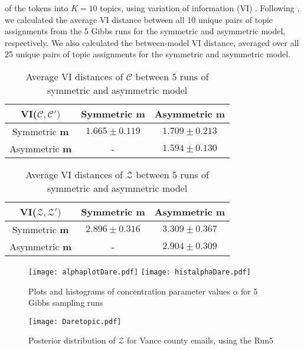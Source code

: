 \documentclass[a4paper]{article}
\begin{document}
of the tokens into $K=10$ topics, using variation
of information (VI) \citep{meilua2003comparing}. Following \cite{wallach2009rethinking}, we calculated
the average VI distance between all 10 unique pairs of topic assignments from the 5 Gibbs runs for the symmetric and asymmetric model, respectively. We also calculated the between-model
VI distance, averaged over all 25 unique pairs of topic assignments for the symmetric and asymmetric model. 
\footnotesize
\begin{table}[ht]
	\centering
	\begin{tabular}{|c|c|c|} 
		\hline
		\textbf{VI($\mathcal{C}, \mathcal{C'})$}& Symmetric \textbf{$\boldsymbol{m}$} &Asymmetric \textbf{ $\boldsymbol{m}$} \\
		\hline
		Symmetric \textbf{$\boldsymbol{m}$} &  $1.665\pm 0.119$&  $1.709\pm 0.213$\\
		\hline
		Asymmetric \textbf{$\boldsymbol{m}$} & - & $1.594 \pm 0.130$\\
		\hline
	\end{tabular}
	\caption {Average VI distances of $\mathcal{C}$ between 5 runs of symmetric and asymmetric model }
	\label{table:VIforC}
\end{table}
\begin{table}[ht]
	\centering
	\begin{tabular}{|c|c|c|} 
		\hline
		\textbf{VI($\mathcal{Z}, \mathcal{Z'})$}& Symmetric \textbf{$\boldsymbol{m}$} &Asymmetric \textbf{ $\boldsymbol{m}$} \\
		\hline
		Symmetric \textbf{$\boldsymbol{m}$} &  $2.896\pm 0.316$&  $3.309\pm 0.367$\\
		\hline
		Asymmetric \textbf{$\boldsymbol{m}$} & - & $2.904\pm 0.309$\\
		\hline
	\end{tabular}
	\caption {Average VI distances of $\mathcal{Z}$ between 5 runs of symmetric and asymmetric model}
	\label{table:VIforZ}
\end{table}
\normalsize
\begin{figure}[ht]
	\centering
	\texttt{[image: alphaplotDare.pdf]} 
	\texttt{[image: histalphaDare.pdf]} 
	\caption{Plots and histograms of concentration parameter values $\alpha$ for 5 Gibbs sampling runs}
	\label{fig:alpha}
\end{figure}
\footnotesize
\begin{figure}[ht]
	\centering
	\texttt{[image: Daretopic.pdf]} 
	\caption{Posterior distribution of  $\mathcal{Z}$ for Vance county emails, using the Run5}
	\label{fig:topicsymasym}
\end{figure}
\end{document}
